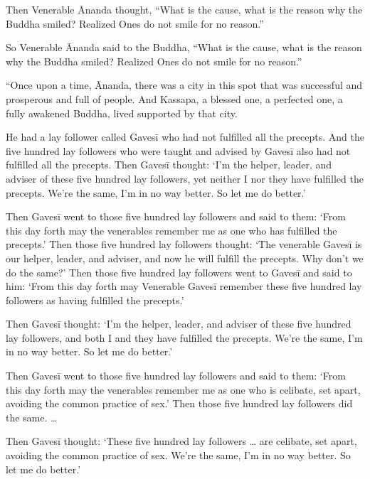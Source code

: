 \documentclass[12pt,openany]{book}%
\begin{document}
Then Venerable Ānanda thought, “What is the cause, what is the reason why the Buddha smiled? Realized Ones do not smile for no reason.” 

So Venerable Ānanda said to the Buddha, “What is the cause, what is the reason why the Buddha smiled? Realized Ones do not smile for no reason.” 

“Once upon a time, Ānanda, there was a city in this spot that was successful and prosperous and full of people. And Kassapa, a blessed one, a perfected one, a fully awakened Buddha, lived supported by that city. 

He had a lay follower called \textsanskrit{Gavesī} who had not fulfilled all the precepts. And the five hundred lay followers who were taught and advised by \textsanskrit{Gavesī} also had not fulfilled all the precepts. Then \textsanskrit{Gavesī} thought: ‘I’m the helper, leader, and adviser of these five hundred lay followers, yet neither I nor they have fulfilled the precepts. We’re the same, I’m in no way better. So let me do better.’ 

Then \textsanskrit{Gavesī} went to those five hundred lay followers and said to them: ‘From this day forth may the venerables remember me as one who has fulfilled the precepts.’ Then those five hundred lay followers thought: ‘The venerable \textsanskrit{Gavesī} is our helper, leader, and adviser, and now he will fulfill the precepts. Why don’t we do the same?’ Then those five hundred lay followers went to \textsanskrit{Gavesī} and said to him: ‘From this day forth may Venerable \textsanskrit{Gavesī} remember these five hundred lay followers as having fulfilled the precepts.’ 

Then \textsanskrit{Gavesī} thought: ‘I’m the helper, leader, and adviser of these five hundred lay followers, and both I and they have fulfilled the precepts. We’re the same, I’m in no way better. So let me do better.’ 

Then \textsanskrit{Gavesī} went to those five hundred lay followers and said to them: ‘From this day forth may the venerables remember me as one who is celibate, set apart, avoiding the common practice of sex.’ Then those five hundred lay followers did the same. … 

Then \textsanskrit{Gavesī} thought: ‘These five hundred lay followers … are celibate, set apart, avoiding the common practice of sex. We’re the same, I’m in no way better. So let me do better.’ 
\end{document}
